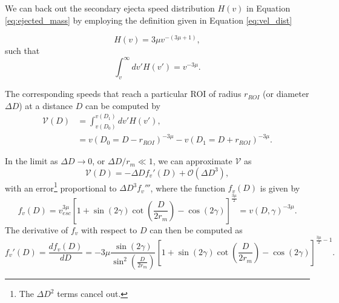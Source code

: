 \documentclass{hitec}
\numberwithin{equation}{section}
\begin{document}
We can back out the secondary ejecta speed distribution $H(v)$ in Equation \eqref{eq:ejected_mass} by employing the definition given in Equation \eqref{eq:vel_dist}

\begin{equation}\label{eq:vel_dist-repeat}
H(v) = 3\mu v^{-(3\mu+1)},
\end{equation}
such that
\begin{equation}
\int_{v}^{\infty}dv'H(v') = v^{-3\mu}.
\end{equation}

The corresponding speeds that reach a particular ROI of radius $r_{ROI}$ (or diameter $\Delta D$) at a distance $D$ can be computed by
\begin{align}
\mathcal{V}(D) &= \int_{v(D_0)}^{v(D_1)}dv'H(v'),\\
&= v(D_0 = D - r_{ROI})^{-3\mu} - v(D_1 = D + r_{ROI})^{-3\mu}.
\end{align}

In the limit as $\Delta D \to 0$, or $\Delta D/r_m \ll 1$, we can approximate $\mathcal{V}$ as
\begin{equation}
\mathcal{V}(D) = -\Delta D f_v'(D) + \mathcal{O}(\Delta D^3),
\end{equation}
with an error\footnote{The $\Delta D^2$ terms cancel out.} proportional to $\Delta D^3f_v'''$, where the function $f_v(D)$ is given by
\begin{equation}
f_v(D) = v_{esc}^{3\mu}\left[1+\sin(2\gamma)\cot\left(\frac{D}{2r_m}\right) - \cos(2\gamma)\right]^{\frac{3\mu}{2}} = v(D,\gamma)^{-3\mu}.
\end{equation}
The derivative of $f_v$ with respect to $D$ can then be computed as
\begin{equation}
f_v'(D) = \frac{df_v(D)}{dD} = -3\mu\frac{\sin(2\gamma)}{\sin^2\left(\frac{D}{2r_m}\right)}\left[1+\sin(2\gamma)\cot\left(\frac{D}{2r_m}\right) - \cos(2\gamma)\right]^{\frac{3\mu}{2}-1}.
\end{equation}
\end{document}
